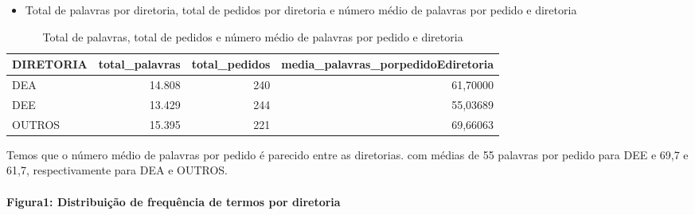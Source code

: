 \documentclass[]{article}
\newenvironment{Shaded}{\begin{snugshade}}{\end{snugshade}}
\newcommand{\KeywordTok}[1]{\textcolor[rgb]{0.13,0.29,0.53}{\textbf{#1}}}
\newcommand{\DataTypeTok}[1]{\textcolor[rgb]{0.13,0.29,0.53}{#1}}
\newcommand{\StringTok}[1]{\textcolor[rgb]{0.31,0.60,0.02}{#1}}
\newcommand{\OperatorTok}[1]{\textcolor[rgb]{0.81,0.36,0.00}{\textbf{#1}}}
\newcommand{\NormalTok}[1]{#1}
\providecommand{\tightlist}{%
  \setlength{\itemsep}{0pt}\setlength{\parskip}{0pt}}
\let\oldparagraph\paragraph
\renewcommand{\paragraph}[1]{\oldparagraph{#1}\mbox{}}
\begin{document}
\begin{itemize}
\tightlist
\item
  Total de palavras por diretoria, total de pedidos por diretoria e
  número médio de palavras por pedido e diretoria
\end{itemize}

\begin{Shaded}
\end{Shaded}

\begin{table}[!h]

\caption{\label{tab:unnamed-chunk-26}Total de palavras, total de pedidos e número médio de palavras por pedido e diretoria}
\centering
\begin{tabular}{lrrr}
\toprule
DIRETORIA & total\_palavras & total\_pedidos & media\_palavras\_porpedidoEdiretoria\\
\midrule
\rowcolor{gray!6}  DEA & 14.808 & 240 & 61,70000\\
DEE & 13.429 & 244 & 55,03689\\
\rowcolor{gray!6}  OUTROS & 15.395 & 221 & 69,66063\\
\bottomrule
\end{tabular}
\end{table}

Temos que o número médio de palavras por pedido é parecido entre as
diretorias. com médias de 55 palavras por pedido para DEE e 69,7 e 61,7,
respectivamente para DEA e OUTROS.

\paragraph{Figura1: Distribuição de frequência de termos por
diretoria}\label{figura1-distribuicao-de-frequencia-de-termos-por-diretoria}
\end{document}
